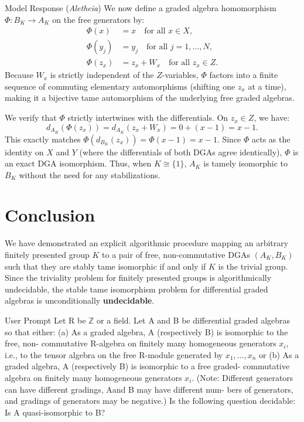 \documentclass{article}
\theoremstyle{plain}
\theoremstyle{definition}
\newcommand{\Aletheia}{\emph{Aletheia}}
\begin{document}
\begin{solution}{Model Response (\Aletheia)}
We now define a graded algebra homomorphism $\Phi: B_K \to A_K$ on the free generators by:
\begin{align*}
    \Phi(x) &= x \quad \text{for all } x \in X, \\
    \Phi(y_j) &= y_j \quad \text{for all } j = 1, \dots, N, \\
    \Phi(z_x) &= z_x + W_x \quad \text{for all } z_x \in Z.
\end{align*}
Because $W_x$ is strictly independent of the $Z$-variables, $\Phi$ factors into a finite sequence of commuting elementary automorphisms (shifting one $z_x$ at a time), making it a bijective tame automorphism of the underlying free graded algebras.

We verify that $\Phi$ strictly intertwines with the differentials. On $z_x \in Z$, we have:
\[
d_{A_K}(\Phi(z_x)) = d_{A_K}(z_x + W_x) = 0 + (x - 1) = x - 1.
\]
This exactly matches $\Phi(d_{B_K}(z_x)) = \Phi(x - 1) = x - 1$. Since $\Phi$ acts as the identity on $X$ and $Y$ (where the differentials of both DGAs agree identically), $\Phi$ is an exact DGA isomorphism. Thus, when $K \cong \{1\}$, $A_K$ is tamely isomorphic to $B_K$ without the need for any stabilizations.

\section{Conclusion}

We have demonstrated an explicit algorithmic procedure mapping an arbitrary finitely presented group $K$ to a pair of free, non-commutative DGAs $(A_K, B_K)$ such that they are stably tame isomorphic if and only if $K$ is the trivial group. Since the triviality problem for finitely presented groups is algorithmically undecidable, the stable tame isomorphism problem for differential graded algebras is unconditionally \textbf{undecidable}.

\end{solution}


\begin{problem}{User Prompt} Let R be $\mathbb{Z}$ or a field. Let A and B be differential graded
algebras so that either:
(a) As a graded algebra, A (respectively B) is isomorphic to the free, non-
commutative R-algebra on finitely many homogeneous generators $x_i$, i.e.,
to the tensor algebra on the free R-module generated by $x_1,\dots,x_n$ or
(b) As a graded algebra, A (respectively B) is isomorphic to a free graded-
commutative algebra on finitely many homogeneous generators $x_i$.
(Note: Different generators can have different gradings, Aand B may have different num-
bers of generators, and gradings of generators may be negative.)
Is the following question decidable:  Is A quasi-isomorphic to B?
\end{problem}
\end{document}
